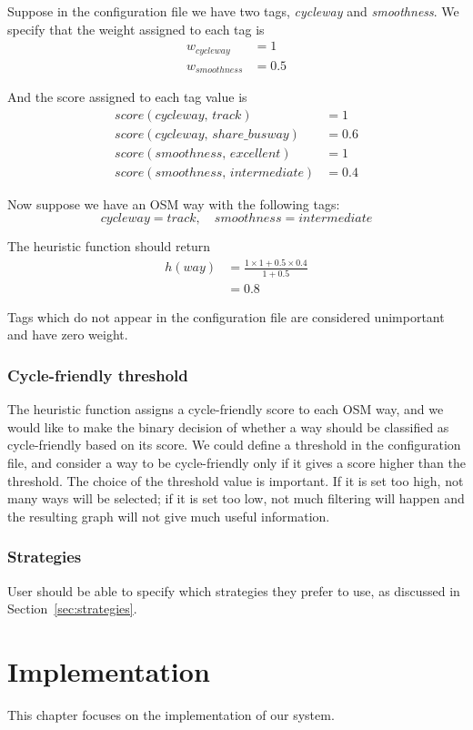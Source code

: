 \documentclass[12pt,a4paper]{report}
\begin{document}
Suppose in the configuration file we have two tags, \textit{cycleway} and \textit{smoothness}. We specify that the weight assigned to each tag is
\begin{align*}
    w_{cycleway} &= 1 \\
    w_{smoothness} &= 0.5
\end{align*}

And the score assigned to each tag value is
\begin{align*}
    score(cycleway,\, track) &= 1 \\
    score(cycleway,\, share\_busway) &= 0.6 \\
    score(smoothness,\, excellent) &= 1 \\
    score(smoothness,\, intermediate) &= 0.4
\end{align*}

Now suppose we have an OSM way with the following tags:
\[cycleway=track,\quad smoothness=intermediate\]

The heuristic function should return
\begin{align*}
    h(way) &= \frac{1\times 1 + 0.5\times 0.4}{1 + 0.5} \\
    &= 0.8
\end{align*}

Tags which do not appear in the configuration file are considered unimportant and have zero weight.

\subsection{Cycle-friendly threshold}
The heuristic function assigns a cycle-friendly score to each OSM way, and we would like to make the binary decision of whether a way should be classified as cycle-friendly based on its score. We could define a threshold in the configuration file, and consider a way to be cycle-friendly only if it gives a score higher than the threshold. The choice of the threshold value is important. If it is set too high, not many ways will be selected; if it is set too low, not much filtering will happen and the resulting graph will not give much useful information.

\subsection{Strategies}
User should be able to specify which strategies they prefer to use, as discussed in Section~\ref{sec:strategies}.

\chapter{Implementation}\label{chapter:impl}
This chapter focuses on the implementation of our system.
\end{document}
